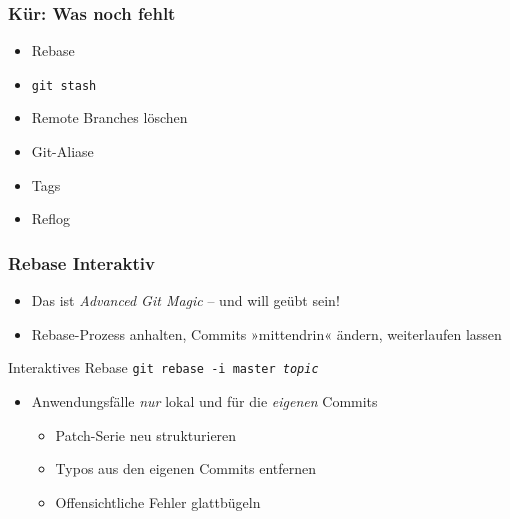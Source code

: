 \documentclass{beamer}
\begin{document}

\begin{frame}
 \frametitle{Kür: Was noch fehlt}
\begin{itemize}
	\item Rebase
	\item \texttt{git stash}
	\item Remote Branches löschen
	\item Git-Aliase
	\item Tags
	\item Reflog
\end{itemize}


 \end{frame}


\begin{frame}
 \frametitle{Rebase Interaktiv}
\begin{itemize}
	\item Das ist \emph{Advanced Git Magic} -- und will geübt sein!
	\item Rebase-Prozess anhalten, Commits »mittendrin« ändern, weiterlaufen lassen
\end{itemize}

\begin{block}{Interaktives Rebase}
\texttt{git rebase -i master \emph{topic}}
\end{block}

\begin{itemize}
	\item Anwendungsfälle \emph{nur} lokal und für die \emph{eigenen} Commits
\begin{itemize}
	\item Patch-Serie neu strukturieren
	\item Typos aus den eigenen Commits entfernen
	\item Offensichtliche Fehler glattbügeln
\end{itemize}
\end{itemize}
 \end{frame}
\end{document}

